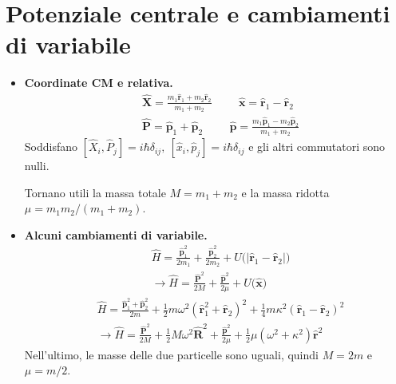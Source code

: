 \documentclass[11pt, a4paper]{scrartcl} %
\numberwithin{equation}{section}
\theoremstyle{style2}
\theoremstyle{style1}
\begin{document}
\section{Potenziale centrale e cambiamenti di variabile}
\begin{multicols}{2}
	\begin{itemize}
		\item {\sffamily \bfseries Coordinate CM e relativa.} 
			\begin{equation}
				\begin{split}
					&\hat{\mathbf{X}} = \frac{m_1\hat{\mathbf{r}}_1 + m_2 \hat{\mathbf{r} }_2}{m_1+m_2} \hspace{1cm} \hat{\mathbf{x}} = \hat{\mathbf{r} }_1 - \hat{\mathbf{r} }_2\\
					& \hat{\mathbf{P} }= \hat{\mathbf{p} }_1 + \hat{\mathbf{p} }_2 \hspace{1cm} \hat{\mathbf{p} } = \frac{m_1\hat{\mathbf{p} }_1 - m_2 \hat{\mathbf{p} }_2}{m_1+m_2}
				\end{split}
			\end{equation}
			Soddisfano $[\hat{X}_i, \hat{P}_j] = i \hbar \delta _{ij} , \ [\hat{x}_i, \hat{p}_j] = i\hbar \delta _{ij} $ e gli altri commutatori sono nulli.

			Tornano utili la massa totale $M = m_1+m_2$ e la massa ridotta $\mu = m_1m_2/(m_1+m_2)$.
			\item {\sffamily \bfseries Alcuni cambiamenti di variabile.} 
				\begin{equation*}
					\begin{split}
						&\hat{H} = \frac{\hat{\mathbf{p}  }_1^2}{2m_1}+ \frac{ \hat{\mathbf{p}  }_2^2}{2m_2} + U\big(\lvert \hat{\mathbf{r} }_1 - \hat{\mathbf{r} }_2 \rvert \big)\\
						&\to  \hat{H} = \frac{\hat{\mathbf{P} }^2}{2M} + \frac{\hat{\mathbf{p}}^2}{2\mu } + U\big(\hat{\mathbf{x} }\big)
					\end{split}
				\end{equation*}
				\begin{equation*}
					\begin{split}
						&\hat{H} = \frac{\hat{\mathbf{p} }_1^2 + \hat{\mathbf{p} }_2^2}{2m} + \frac{1}{2}m\omega^2 (\hat{\mathbf{r} }_1^2 + \hat{\mathbf{r} }_2)^2 + \frac{1}{4}m \kappa ^2 (\hat{\mathbf{r} }_1 - \hat{\mathbf{r} }_2)^2\\
						&\to \hat{H} = \frac{\hat{\mathbf{P} }^2}{2M}+\frac{1}{2}M\omega^2 \hat{\mathbf{R} }^2 + \frac{\hat{\mathbf{p} }^2}{2\mu } + \frac{1}{2}\mu (\omega ^2 + \kappa ^2 ) \hat{\mathbf{r} }^2
					\end{split}
				\end{equation*}
				Nell'ultimo, le masse delle due particelle sono uguali, quindi $M = 2m $ e $\mu = m / 2$.
	\end{itemize}
\end{multicols}
\end{document}
